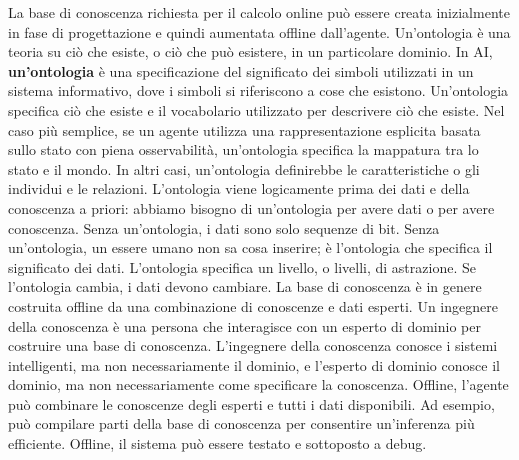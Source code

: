 \documentclass[a4paper]{extarticle}
\begin{document}
La base di conoscenza richiesta per il calcolo online può essere creata inizialmente in fase di progettazione e quindi aumentata offline dall'agente. Un'ontologia è una teoria su ciò che esiste, o ciò che può esistere, in un particolare dominio. In AI, \textbf{un'ontologia} è una specificazione del significato dei simboli utilizzati in un sistema informativo, dove i simboli si riferiscono a cose che esistono. Un'ontologia specifica ciò che esiste e il vocabolario utilizzato per descrivere ciò che esiste. Nel caso più semplice, se un agente utilizza una rappresentazione esplicita basata sullo stato con piena osservabilità, un'ontologia specifica la mappatura tra lo stato e il mondo. In altri casi, un'ontologia definirebbe le caratteristiche o gli individui e le relazioni. L'ontologia viene logicamente prima dei dati e della conoscenza a priori: abbiamo bisogno di un'ontologia per avere dati o per avere conoscenza. Senza un'ontologia, i dati sono solo sequenze di bit. Senza un'ontologia, un essere umano non sa cosa inserire; è l'ontologia che specifica il significato dei dati. L'ontologia specifica un livello, o livelli, di astrazione. Se l'ontologia cambia, i dati devono cambiare. La base di conoscenza è in genere costruita offline da una combinazione di conoscenze e dati esperti. Un ingegnere della conoscenza è una persona che interagisce con un esperto di dominio per costruire una base di conoscenza. L'ingegnere della conoscenza conosce i sistemi intelligenti, ma non necessariamente il dominio, e l'esperto di dominio conosce il dominio, ma non necessariamente come specificare la conoscenza. Offline, l'agente può combinare le conoscenze degli esperti e tutti i dati disponibili. Ad esempio, può compilare parti della base di conoscenza per consentire un'inferenza più efficiente. Offline, il sistema può essere testato e sottoposto a debug.
\end{document}

